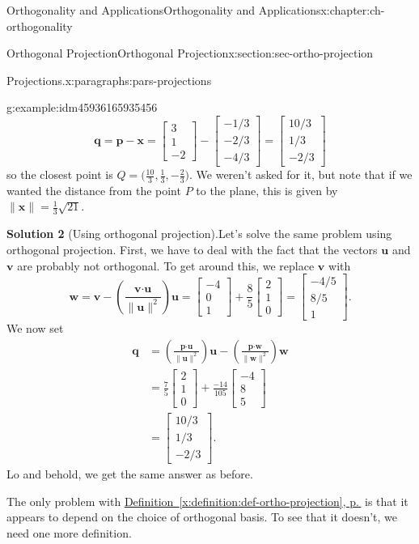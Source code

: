 \documentclass[oneside,10pt,]{book}
\newcommand{\blocktitlefont}{\relax}
\newcommand{\xreffont}{\relax}
\numberwithin{equation}{section}
\newcommand{\bbm}{\begin{bmatrix}}
\newcommand{\ebm}{\end{bmatrix}}
\newcommand{\dotp}{\!\boldsymbol{\cdot}\!}
\newcommand{\len}[1]{\lVert #1\rVert}
\newcommand{\uu}{\mathbf{u}}
\newcommand{\vv}{\mathbf{v}}
\newcommand{\ww}{\mathbf{w}}
\newcommand{\xx}{\mathbf{x}}
\newcommand{\amp}{&}
\begin{document}
\begin{chapterptx}{Orthogonality and Applications}{}{Orthogonality and Applications}{}{}{x:chapter:ch-orthogonality}
\begin{sectionptx}{Orthogonal Projection}{}{Orthogonal Projection}{}{}{x:section:sec-ortho-projection}
\begin{paragraphs}{Projections.}{x:paragraphs:pars-projections}
\begin{example}{}{g:example:idm45936165935456}
\begin{equation*}
\mathbf{q}=\mathbf{p}-\xx=\bbm 3\\1\\-2\ebm-\bbm -1/3\\-2/3\\-4/3\ebm = \bbm 10/3\\1/3\\-2/3\ebm
\end{equation*}
so the closest point is \(Q=\bigl(\frac{10}{3},\frac13,-\frac{2}{3}\bigr)\). We weren't asked for it, but note that if we wanted the distance from the point \(P\) to the plane, this is given by \(\len{\xx}=\frac13\sqrt{21}\).%
\par\smallskip%
\noindent\textbf{\blocktitlefont Solution 2} (Using orthogonal projection).\label{g:solution:idm45936165923344}{}\hypertarget{g:solution:idm45936165923344}{}\quad{}Let's solve the same problem using orthogonal projection. First, we have to deal with the fact that the vectors \(\uu\) and \(\vv\) are probably not orthogonal. To get around this, we replace \(\vv\) with%
\begin{equation*}
\ww = \vv-\left(\frac{\vv\dotp\uu}{\len{\uu}^2}\right)\uu = \bbm -4\\0\\1\ebm+\frac 85\bbm 2\\1\\0\ebm = \bbm -4/5\\8/5\\1\ebm\text{.}
\end{equation*}
We now set%
\begin{align*}
\mathbf{q} \amp =\left(\frac{\mathbf{p}\dotp\uu}{\len{\uu}^2}\right)\uu-\left(\frac{\mathbf{p}\dotp\ww}{\len{\ww}^2}\right)\ww\\
\amp = \frac{7}{5}\bbm 2\\1\\0\ebm +\frac{-14}{105}\bbm -4\\8\\5\ebm \\
\amp = \bbm 10/3\\1/3\\-2/3\ebm\text{.}
\end{align*}
Lo and behold, we get the same answer as before.%
\end{example}
The only problem with \hyperref[x:definition:def-ortho-projection]{Definition~{\xreffont\ref{x:definition:def-ortho-projection}}, p.\,\pageref{x:definition:def-ortho-projection}} is that it appears to depend on the choice of orthogonal basis. To see that it doesn't, we need one more definition.%

\end{paragraphs}
\end{sectionptx}
\end{chapterptx}
\end{document}
